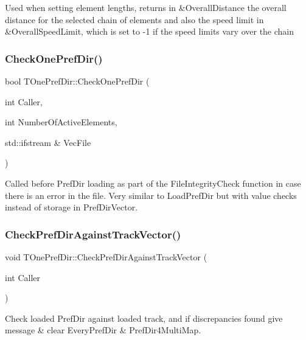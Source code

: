 Used when setting element lengths, returns in \&Overall\+Distance the overall distance for the selected chain of elements and also the speed limit in \&Overall\+Speed\+Limit, which is set to -\/1 if the speed limits vary over the chain \mbox{\label{class_t_one_pref_dir_a1896affce3465b84cfd5128cca122639}} 
\subsubsection{\texorpdfstring{Check\+One\+Pref\+Dir()}{CheckOnePrefDir()}}
{\footnotesize\ttfamily bool T\+One\+Pref\+Dir\+::\+Check\+One\+Pref\+Dir (\begin{DoxyParamCaption}\item[{int}]{Caller,  }\item[{int}]{Number\+Of\+Active\+Elements,  }\item[{std\+::ifstream \&}]{Vec\+File }\end{DoxyParamCaption})}

Called before Pref\+Dir loading as part of the File\+Integrity\+Check function in case there is an error in the file. Very similar to Load\+Pref\+Dir but with value checks instead of storage in Pref\+Dir\+Vector. \mbox{\label{class_t_one_pref_dir_ab79dc3f93a471d2182ce625fcac1ff2d}} 
\subsubsection{\texorpdfstring{Check\+Pref\+Dir\+Against\+Track\+Vector()}{CheckPrefDirAgainstTrackVector()}}
{\footnotesize\ttfamily void T\+One\+Pref\+Dir\+::\+Check\+Pref\+Dir\+Against\+Track\+Vector (\begin{DoxyParamCaption}\item[{int}]{Caller }\end{DoxyParamCaption})}

Check loaded Pref\+Dir against loaded track, and if discrepancies found give message \& clear Every\+Pref\+Dir \& Pref\+Dir4\+Multi\+Map. \mbox{\label{class_t_one_pref_dir_ab8c8ad293f45948986903a05302b2dc8}} 
